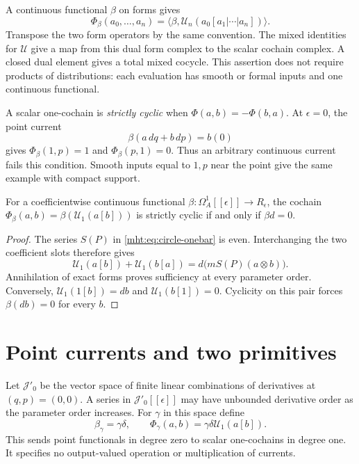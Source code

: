 A continuous functional $\beta$ on forms gives
\[
 \Phi_\beta(a_0,\ldots,a_n)
   =\langle\beta,\mathcal U_n(a_0[a_1|\cdots|a_n])\rangle.
\]
Transpose the two form operators by the same convention.
The mixed identities for $\mathcal U$ give a map from this
dual form complex to the scalar cochain complex.
A closed dual element gives a total mixed cocycle.
This assertion does not require products of distributions:
each evaluation has smooth or formal inputs and one
continuous functional.

A scalar one-cochain is \emph{strictly cyclic} when
$\Phi(a,b)=-\Phi(b,a)$. At $\epsilon=0$, the point current
\[
 \beta(a\,dq+b\,dp)=b(0)
\]
gives $\Phi_\beta(1,p)=1$ and $\Phi_\beta(p,1)=0$.
Thus an arbitrary continuous current fails this condition.
Smooth inputs equal to $1,p$ near the point give the same
example with compact support.

\begin{proposition}\label{mht:prop:all-order-current-cyclicity}
For a coefficientwise continuous functional
$\beta:\Omega_A^1[[\epsilon]]\to R_\epsilon$, the cochain
$\Phi_\beta(a,b)=\beta(\mathcal U_1(a[b]))$ is strictly
cyclic if and only if $\beta d=0$.
\end{proposition}
\begin{proof}
The series $S(P)$ in \eqref{mht:eq:circle-onebar} is even.
Interchanging the two coefficient slots therefore gives
\[
 \mathcal U_1(a[b])+\mathcal U_1(b[a])
       =d\bigl(mS(P)(a\otimes b)\bigr).
\]
Annihilation of exact forms proves sufficiency at every
parameter order. Conversely,
$\mathcal U_1(1[b])=db$ and $\mathcal U_1(b[1])=0$.
Cyclicity on this pair forces $\beta(db)=0$ for every $b$.
\end{proof}

\section{Point currents and two primitives}

Let $\mathscr J'_0$ be the vector space of finite linear
combinations of derivatives at $(q,p)=(0,0)$.
A series in $\mathscr J'_0[[\epsilon]]$ may have unbounded
derivative order as the parameter order increases.
For $\gamma$ in this space define
\[
 \beta_\gamma=\gamma\delta,\qquad
 \Phi_\gamma(a,b)=\gamma\delta\mathcal U_1(a[b]).
\]
This sends point functionals in degree zero to scalar
one-cochains in degree one. It specifies no output-valued
operation or multiplication of currents.

